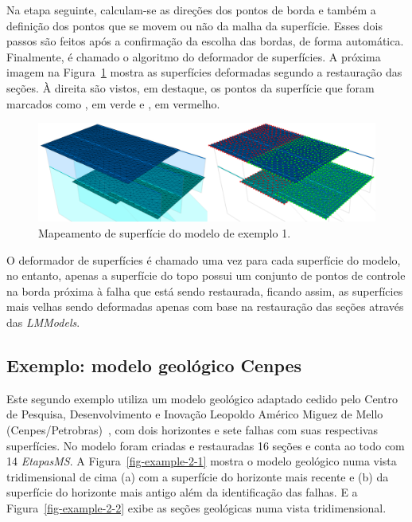 Na etapa seguinte, calculam-se as direções dos pontos de borda e também a definição dos pontos que se movem ou não da malha da superfície. Esses dois passos são feitos após a confirmação da escolha das bordas, de forma automática. Finalmente, é chamado o algoritmo do deformador de superfícies. A próxima imagem na Figura~\ref{fig-example-1-5} mostra as superfícies deformadas segundo a restauração das seções. À direita são vistos, em destaque, os pontos da superfície que foram marcados como , em verde e , em vermelho.

\begin{figure} [H]
  \begin{center}
    \includegraphics[width=\textwidth]{images/fig-example-1-5}
    \caption{Mapeamento de superfície do modelo de exemplo 1.}\label{fig-example-1-5}
  \end{center}
\end{figure}

O deformador de superfícies é chamado uma vez para cada superfície do modelo, no entanto, apenas a superfície do topo possui um conjunto de pontos de controle na borda próxima à falha que está sendo restaurada, ficando assim, as superfícies mais velhas sendo deformadas apenas com base na restauração das seções através das \textit{LMModels}.

\subsection{Exemplo: modelo geológico Cenpes}\label{ex-2-surf}

Este segundo exemplo utiliza um modelo geológico adaptado cedido pelo Centro de Pesquisa, Desenvolvimento e Inovação Leopoldo Américo Miguez de Mello (Cenpes/Petrobras)~\cite{Cenpes}, com dois horizontes e sete falhas com suas respectivas superfícies. No modelo foram criadas e restauradas 16 seções e conta ao todo com 14 \textit{EtapasMS}. A Figura~\ref{fig-example-2-1} mostra o modelo geológico numa vista tridimensional de cima (a) com a superfície do horizonte mais recente e (b) da superfície do horizonte mais antigo além da identificação das falhas. E a Figura~\ref{fig-example-2-2} exibe as seções geológicas numa vista tridimensional.

